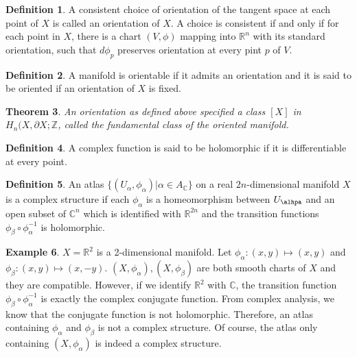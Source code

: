 \documentclass[11pt, psamsfonts]{amsart}
\newtheorem{thm}{Theorem}[section]
\theoremstyle{definition}
\newtheorem{defn}[thm]{Definition}
\newtheorem{exmp}[thm]{Example}
\theoremstyle{remark}
\numberwithin{equation}{section}
\begin{document}
\begin{defn}
  A consistent choice of orientation of the tangent space at each point of $X$ is called an orientation of $X$.
  A choice is consistent if and only if for each point in $X$, there is a chart $(V, \phi)$ mapping into $\mathbb{R}^n$ with its standard orientation, such that $d\phi_p$ preserves orientation at every pint $p$ of $V$.
\end{defn}

\begin{defn}
  A manifold is orientable if it admits an orientation and it is said to be oriented if an orientation of $X$ is fixed.
\end{defn}

\begin{thm}
  An orientation as defined above specified a class $[X]$ in $H_n(X, \partial X; \mathbb{Z}$, called the fundamental class of the oriented manifold.
\end{thm}

\begin{defn}
  A complex function is said to be holomorphic if it is differentiable at every point.
\end{defn}

\begin{defn}
  An atlas $\{ (U_{\alpha}, \phi_{\alpha}) \vert \alpha \in A_{\mathbb{C}} \}$ on a real $2n$-dimensional manifold $X$ is a complex structure if each $\phi_{\alpha}$ is a homeomorphism between $U_{\alhpa}$ and an open subset of $\mathbb{C}^n$ which is identified with $\mathbb{R}^{2n}$ and the transition functions $\phi_{\beta} \circ \phi_{\alpha}^{-1}$ is holomorphic.
\end{defn}

\begin{exmp}
  $X = \mathbb{R}^2$ is a 2-dimensional manifold.
  Let $\phi_{\alpha}: (x, y) \mapsto (x, y)$ and $\phi_{\beta}: (x, y) \mapsto(x, -y)$.
  $(X, \phi_{\alpha}), (X, \phi_{\beta})$ are both smooth charts of $X$ and they are compatible.
  However, if we identify $\mathbb{R}^2$ with $\mathbb{C}$, the transition function $\phi_{\beta} \circ \phi_{\alpha}^{-1}$ is exactly the complex conjugate function.
  From complex analysis, we know that the conjugate function is not holomorphic.
  Therefore, an atlas containing $\phi_{\alpha}$ and $\phi_{\beta}$ is not a complex structure.
  Of course, the atlas only containing $(X, \phi_{\alpha})$ is indeed a complex structure.
\end{exmp}
\end{document}
